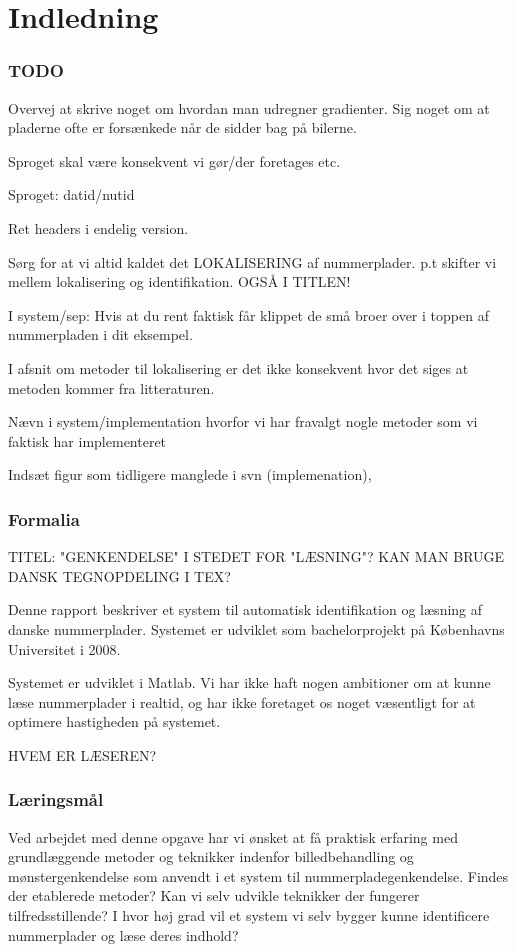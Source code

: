 \section{Indledning}

\subsubsection*{TODO}
Overvej at skrive noget om hvordan man udregner gradienter.
Sig noget om at pladerne ofte er forsænkede når de sidder bag på bilerne.

Sproget skal være konsekvent vi gør/der foretages etc.

Sproget: datid/nutid

Ret headers i endelig version.

Sørg for at vi altid kaldet det LOKALISERING af nummerplader. p.t skifter vi mellem lokalisering og identifikation. OGSÅ I TITLEN!

I system/sep: Hvis at du rent faktisk får klippet de små broer over i toppen af nummerpladen i dit eksempel.

I afsnit om metoder til lokalisering er det ikke konsekvent hvor det siges at metoden kommer fra litteraturen.

Nævn i system/implementation hvorfor vi har fravalgt nogle metoder som vi faktisk har implementeret

Indsæt figur som tidligere manglede i svn (implemenation),

\subsubsection*{Formalia}

TITEL: "GENKENDELSE" I STEDET FOR "LÆSNING"?
KAN MAN BRUGE DANSK TEGNOPDELING I TEX?

Denne rapport beskriver et system til automatisk identifikation og læsning af danske nummerplader. Systemet er udviklet som bachelorprojekt på Københavns Universitet i 2008.


Systemet er udviklet i Matlab. Vi har ikke haft nogen ambitioner om at kunne læse nummerplader i realtid, og har ikke foretaget os noget væsentligt for at optimere hastigheden på systemet.

HVEM ER LÆSEREN?

\subsubsection*{Læringsmål}
Ved arbejdet med denne opgave har vi ønsket at få praktisk erfaring med grundlæggende metoder og teknikker indenfor billedbehandling og mønstergenkendelse som anvendt i et system til nummerpladegenkendelse. Findes der etablerede metoder? Kan vi selv udvikle teknikker der fungerer tilfredsstillende? I hvor høj grad vil et system vi selv bygger kunne identificere nummerplader og læse deres indhold?

